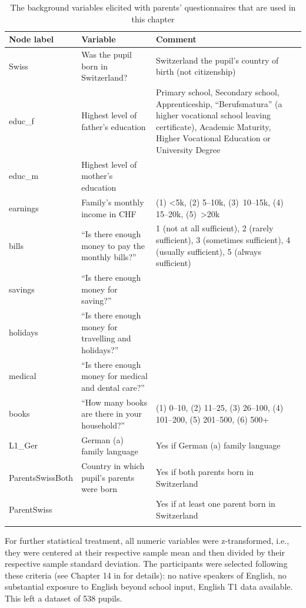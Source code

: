 \documentclass[output=paper]{langsci/langscibook}
\begin{document}
\begin{table}\small
\caption{The background variables elicited with parents’ questionnaires that are used in this chapter\label{tab:05:1}}
\begin{tabularx}{\textwidth}{lQQ}
\lsptoprule
{Node label} & {Variable} & {Comment}\\\midrule
Swiss & Was the pupil born in Switzerland? & Switzerland the pupil’s country of birth (not citizenship)\\
educ\_f & Highest level of father’s education & Primary school, Secondary school, Apprenticeship, “Berufsmatura” (a higher vocational school leaving certificate),  Academic Maturity, Higher Vocational Education or University Degree\\
educ\_m & Highest level of mother’s education & \\
earnings & Family’s monthly income in CHF & (1) <5k, (2) 5--10k, (3)~10--15k, (4) 15--20k, (5)~>20k\\
bills & “Is there enough money to pay the monthly bills?” & 1 (not at all sufficient), 2 (rarely sufficient), 3 (sometimes sufficient), 4 (usually sufficient), 5 (always sufficient)\\
savings & “Is there enough money for saving?” & \\
holidays & “Is there enough money for travelling and holidays?” & \\
medical & “Is there enough money for medical and dental care?” & \\
books & “How many books are there in your household?” & (1) 0--10, (2) 11--25, (3) 26--100, (4) 101--200, (5) 201--500, (6) 500+\\
L1\_Ger & German (a) family language & Yes if German (a) family language\\
ParentsSwissBoth & Country in which pupil’s parents were born & Yes if both parents born in Switzerland\\
ParentSwiss &  & Yes if at least one parent born in Switzerland\\
\lspbottomrule
\end{tabularx}
\end{table}

For further statistical treatment, all numeric variables were z-transformed, i.e., they were centered at their respective sample mean and then divided by their respective sample standard deviation. The participants were selected following these criteria (see Chapter 14 in \citealt{Vanhove2021} for details): no native speakers of English, no substantial exposure to English beyond school input, English T1 data available. This left a dataset of 538 pupils.
\end{document}

